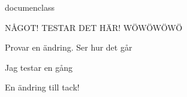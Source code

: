 {documenclass}

NÅGOT! TESTAR DET HÄR! WÖWÖWÖWÖ

Provar en ändring. Ser hur det går

Jag testar en gång 

En ändring till tack!